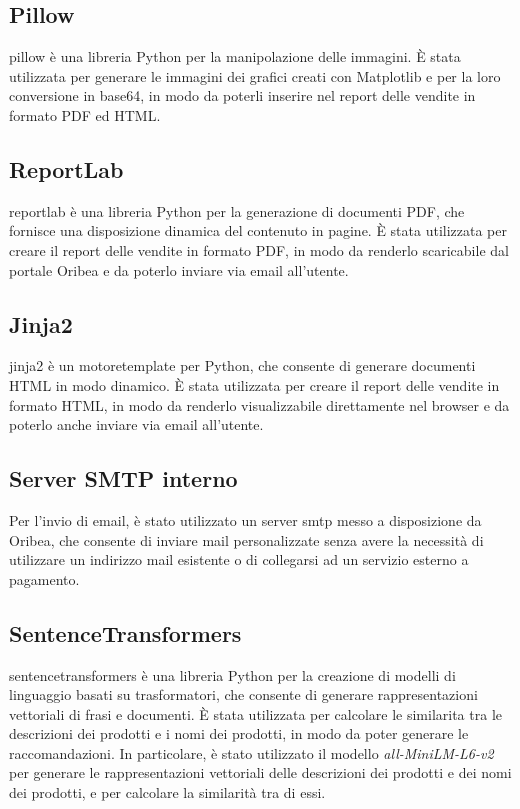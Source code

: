 \subsection{Pillow}
\gls{pillow} è una libreria Python per la manipolazione delle immagini. È stata utilizzata per generare le immagini dei grafici creati con Matplotlib e per la loro conversione in \gls{base64}, in modo da poterli inserire nel report delle vendite in formato PDF ed HTML.

\subsection{ReportLab}
\gls{reportlab} è una libreria Python per la generazione di documenti PDF, che fornisce una disposizione dinamica del contenuto in pagine. È stata utilizzata per creare il report delle vendite in formato PDF, in modo da renderlo scaricabile dal portale Oribea e da poterlo inviare via email all'utente.

\subsection{Jinja2}
\gls{jinja2} è un \gls{motoretemplate} per Python, che consente di generare documenti HTML in modo dinamico. È stata utilizzata per creare il report delle vendite in formato HTML, in modo da renderlo visualizzabile direttamente nel browser e da poterlo anche inviare via email all'utente.

\subsection{Server SMTP interno}
Per l'invio di email, è stato utilizzato un server \gls{smtp} messo a disposizione da Oribea, che consente di inviare mail personalizzate senza avere la necessità di utilizzare un indirizzo mail esistente o di collegarsi ad un servizio esterno a pagamento. 

\subsection{SentenceTransformers}
\gls{sentencetransformers} è una libreria Python per la creazione di modelli di linguaggio basati su trasformatori, che consente di generare rappresentazioni vettoriali di frasi e documenti. È stata utilizzata per calcolare le \gls{similarita} tra le descrizioni dei prodotti e i nomi dei prodotti, in modo da poter generare le raccomandazioni. In particolare, è stato utilizzato il modello \emph{all-MiniLM-L6-v2} per generare le rappresentazioni vettoriali delle descrizioni dei prodotti e dei nomi dei prodotti, e per calcolare la similarità tra di essi.

